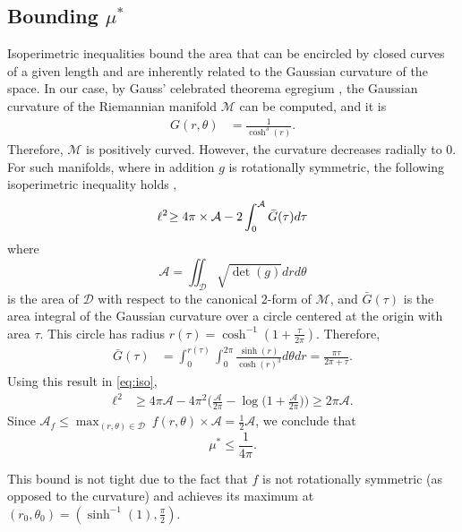 \documentclass[
 reprint,
superscriptaddress,
 amsmath,amssymb,prl
 aps
]{revtex4-2}
\newcommand{\Area}{{\mathcal A}}
\begin{document}
\begin{widetext}
\newpage


\appendix
\section{Bounding $
\mu^*$}
Isoperimetric inequalities bound the area that can be encircled by closed curves of a given length and are inherently related to the Gaussian curvature of the space. In our case, by Gauss' celebrated theorema egregium \cite[page 23]{morgan1998riemannian}, the Gaussian curvature of the Riemannian manifold $\mathcal M$ can be computed, and it is
\begin{align}\nonumber
G(r,\theta)&=\frac{1}{\cosh^3(r)}.
\end{align}
Therefore, $\mathcal M$ is positively curved. However, the curvature decreases radially to $0$. For such manifolds, where in addition $g$ is rotationally symmetric, the following isoperimetric inequality holds
\cite[Page 113]{morgan1998riemannian},
\begin{equation}\label{eq:iso}
\ell^2 \hspace*{-2pt}\geq 4\pi\times {\Area} -2\int_0^{\Area}\bar G(\tau)d\tau
\end{equation}
where 
\[
\Area=\iint_{\mathcal D}
    \sqrt{\det(g)}drd\theta
\]
is the area of $\mathcal D$ with respect to the canonical $2$-form of $\mathcal M$, and
$\bar G(\tau)$ is the area integral of the Gaussian curvature over a circle centered at the origin with area $\tau$. This circle has radius $r(\tau)=\cosh^{-1}(1+\frac{\tau}{2\pi})$. Therefore,
\begin{align*}
   \bar G(\tau)&=\int_0^{r(\tau)}\int_0^{2\pi}\frac{\sinh(r)}{\cosh(r)^3}d\theta dr=\frac{\pi\tau}{2\pi + \tau}.
\end{align*}
Using this result in \eqref{eq:iso},
\begin{align*}
\ell^2&\geq 4\pi\Area- 4\pi^2\bigg(\frac{\Area}{2\pi}-\log\big(1+\frac{\Area}{2\pi}\big)\bigg)
\geq 2\pi \Area.
\end{align*}
Since  $   \Area_f\leq  \max_{(r,\theta)\in\mathcal D} ~f(r,\theta) \times \Area=\frac12 \Area
$, we conclude that
\[\mu^*\leq \frac{1}{4\pi}.
\]

    This bound is not tight due to the fact that $f$ is not rotationally symmetric (as opposed to the curvature) and achieves its maximum at $(r_0,\theta_0)=(\sinh^{-1}(1),\frac{\pi}{2})$. 
    

\end{widetext}
\end{document}
